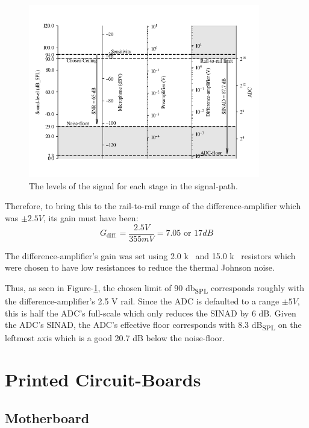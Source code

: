 \documentclass[notitlepage]{report}
\begin{document}
\begin{figure}[H]
\includegraphics[width=0.9\textwidth]{../Python/report/gains.png}
\centering
\caption{The levels of the signal for each stage in the signal-path.}
\label{fig:design_gains}
\centering
\end{figure}

Therefore, to bring this to the rail-to-rail range of the difference-amplifier which was $\pm2.5 \si{V}$, its gain must have been:
\begin{equation}
G_{\text{diff.}} = \frac{2.5 \si{V}}{355 \si{mV}} = 7.05 \text{ or } 17 \si{dB}
\end{equation}

The difference-amplifier's gain was set using 2.0 \si{k\Omega} and 15.0 \si{k\Omega} resistors which were chosen to have low resistances to reduce the thermal Johnson noise.

Thus, as seen in Figure-\ref{fig:design_gains}, the chosen limit of 90 \si{db_{SPL}} corresponds roughly with the difference-amplifier's 2.5 \si{V} rail. Since the ADC is defaulted to a range $\pm5 \si{V}$, this is half the ADC's full-scale which only reduces the SINAD by 6 \si{dB}. Given the ADC's SINAD, the ADC's effective floor corresponds with 8.3 \si{dB_{SPL}} on the leftmost axis which is a good 20.7 \si{dB} below the noise-floor.

\section{Printed Circuit-Boards}

\subsection{Motherboard}
\end{document}
